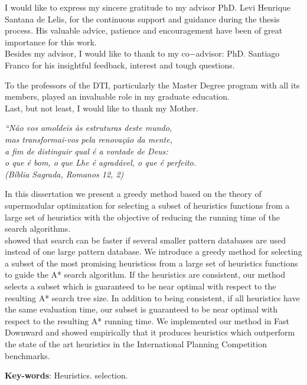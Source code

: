 \documentclass[
	12pt,				%
	openright,			%
	twoside,			%
	a4paper,			%
	english,			%
	french,				%
	spanish,			%
	brazil				%
	]{abntex2}
\begin{document}
\begin{agradecimentos}
I would like to express my sincere gratitude to my advisor PhD. Levi Henrique Santana de Lelis, for the continuous support and guidance during the thesis process. His valuable advice, patience and encouragement have been of great
importance for this work. \\

Besides my advisor, I would like to thank to my co$-$advisor: PhD. Santiago Franco for his insightful feedback, interest and tough questions.

To the professors of the DTI, particularly the Master Degree program with all its members, played an invaluable role in my graduate education. \\

Last, but not least, I would like to thank my Mother.
\end{agradecimentos}

\begin{epigrafe}
    \vspace*{\fill}
	\begin{flushright}
		\textit{``Não vos amoldeis às estruturas deste mundo, \\
		mas transformai-vos pela renovação da mente, \\
		a fim de distinguir qual é a vontade de Deus: \\
		o que é bom, o que Lhe é agradável, o que é perfeito.\\
		(Bíblia Sagrada, Romanos 12, 2)}
	\end{flushright}
\end{epigrafe}


\setlength{\absparsep}{18pt} %
\begin{resumo}
In this dissertation we present a greedy method based on the theory of supermodular optimization for selecting a subset of heuristics functions from a large set of heuristics with the objective of reducing the running time of the search algorithms. \\ 

 \cite{holte2006maximizing} showed that search can be faster if several smaller pattern databases are used instead of one large pattern database. We introduce a greedy method for selecting a subset of the most promising heuristicss from a large set of heuristics functions to guide the A* search algorithm. If the heuristics are consistent, our method selects a subset which is guaranteed to be near optimal with respect to the resulting A* search tree size. In addition to being consistent, if all heuristics have the same evaluation time, our subset is guaranteed to be near optimal with respect to the resulting A* running time. We implemented our method in Fast Downward and showed empirically that it produces heuristics which outperform the state of the art heuristics in the International Planning Competition benchmarks.

 \textbf{Key-words}: Heuristics. selection.
\end{resumo}
\end{document}

